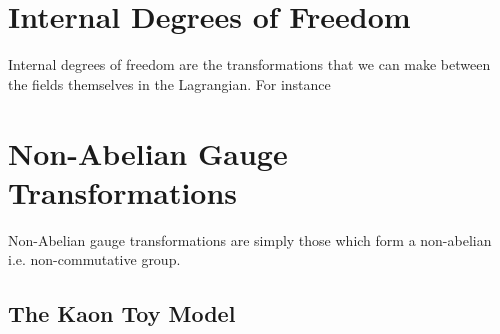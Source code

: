 \section{Internal Degrees of Freedom}
Internal degrees of freedom are the transformations that we can make between the fields themselves in the Lagrangian. For instance

\section{Non-Abelian Gauge Transformations}
Non-Abelian gauge transformations are simply those which form a non-abelian i.e. non-commutative group.

\subsection{The Kaon Toy Model}

